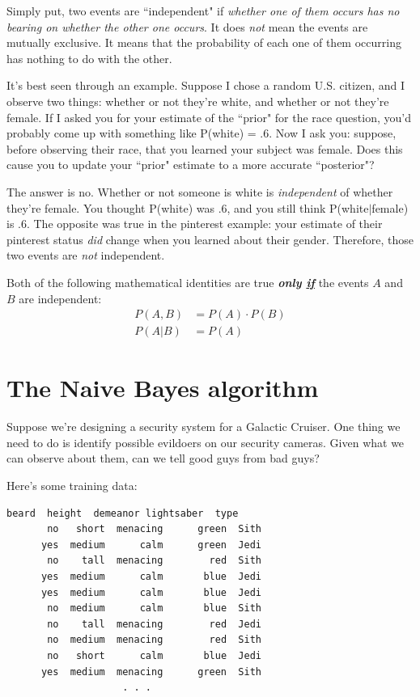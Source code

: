 \documentclass[12pt]{article}
\begin{document}
Simply put, two events are ``independent" if \textit{whether one of them
occurs has no bearing on whether the other one occurs}. It does \textit{not}
mean the events are mutually exclusive. It means that the probability of each
one of them occurring has nothing to do with the other.

It's best seen through an example. Suppose I chose a random U.S. citizen, and
I observe two things: whether or not they're white, and whether or not they're
female. If I asked you for your estimate of the ``prior" for the race
question, you'd probably come up with something like P(white) = .6. Now I ask
you: suppose, before observing their race, that you learned your subject was
female. Does this cause you to update your ``prior" estimate to a more
accurate ``posterior"?

The answer is no. Whether or not someone is white is \textit{independent} of
whether they're female. You thought P(white) was .6, and you still think
P(white$|$female) is .6. The opposite was true in the pinterest example: your
estimate of their pinterest status \textit{did} change when you learned about
their gender. Therefore, those two events are \textit{not} independent.

Both of the following mathematical identities are true \textit{\textbf{only
\underline{if}}} the events $A$ and $B$ are independent:
\vspace{-.2in}
\begin{align*}
P(A,B) &= P(A) \cdot P(B) \\
P(A|B) &= P(A)
\end{align*}

\section{The Naive Bayes algorithm}

Suppose we're designing a security system for a Galactic Cruiser. One thing we
need to do is identify possible evildoers on our security cameras. Given what
we can observe about them, can we tell good guys from bad guys?

Here's some training data:
\begin{Verbatim}[fontsize=\small,samepage=true,frame=none]
    beard  height  demeanor lightsaber  type
       no   short  menacing      green  Sith
      yes  medium      calm      green  Jedi
       no    tall  menacing        red  Sith
      yes  medium      calm       blue  Jedi
      yes  medium      calm       blue  Jedi
       no  medium      calm       blue  Sith
       no    tall  menacing        red  Jedi
       no  medium  menacing        red  Sith
       no   short      calm       blue  Jedi
      yes  medium  menacing      green  Sith
                    . . .
\end{Verbatim}
\end{document}
